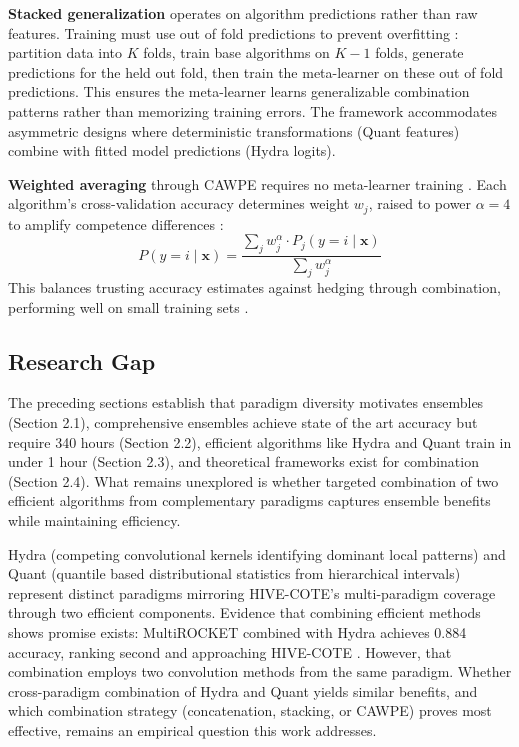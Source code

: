 \documentclass[pdflatex,sn-basic]{sn-jnl}           %
\theoremstyle{thmstyleone}%
\theoremstyle{thmstyletwo}%
\theoremstyle{thmstylethree}%
\begin{document}
\textbf{Stacked generalization} \citep{stacked-generalization} operates on algorithm predictions rather than raw features. Training must use out of fold predictions to prevent overfitting \citep[p.~244]{stacked-generalization}: partition data into $K$ folds, train base algorithms on $K-1$ folds, generate predictions for the held out fold, then train the meta-learner on these out of fold predictions. This ensures the meta-learner learns generalizable combination patterns rather than memorizing training errors. The framework accommodates asymmetric designs where deterministic transformations (Quant features) combine with fitted model predictions (Hydra logits).

\textbf{Weighted averaging} through CAWPE requires no meta-learner training \citep{cawpe}. Each algorithm's cross-validation accuracy determines weight $w_j$, raised to power $\alpha=4$ to amplify competence differences \citep[p.~1675]{cawpe}:
\begin{equation}
P(y=i \mid \mathbf{x}) = \frac{\sum_j w_j^\alpha \cdot P_j(y=i \mid \mathbf{x})}{\sum_j w_j^\alpha}
\end{equation}
This balances trusting accuracy estimates against hedging through combination, performing well on small training sets \citep[Table~3, p.~1693]{cawpe}.

\subsection{Research Gap}

The preceding sections establish that paradigm diversity motivates ensembles (Section 2.1), comprehensive ensembles achieve state of the art accuracy but require 340 hours (Section 2.2), efficient algorithms like Hydra and Quant train in under 1 hour (Section 2.3), and theoretical frameworks exist for combination (Section 2.4). What remains unexplored is whether targeted combination of two efficient algorithms from complementary paradigms captures ensemble benefits while maintaining efficiency.

Hydra (competing convolutional kernels identifying dominant local patterns) and Quant (quantile based distributional statistics from hierarchical intervals) represent distinct paradigms mirroring HIVE-COTE's multi-paradigm coverage through two efficient components. Evidence that combining efficient methods shows promise exists: MultiROCKET combined with Hydra achieves 0.884 accuracy, ranking second and approaching HIVE-COTE \citep[Table~14, p.~2008]{bakeoff-redux}. However, that combination employs two convolution methods from the same paradigm. Whether cross-paradigm combination of Hydra and Quant yields similar benefits, and which combination strategy (concatenation, stacking, or CAWPE) proves most effective, remains an empirical question this work addresses.
\end{document}
